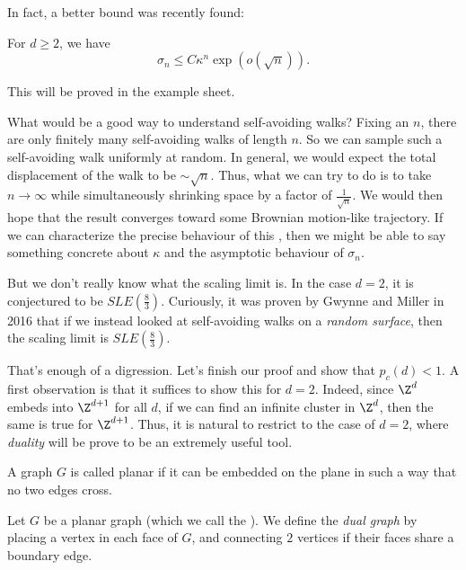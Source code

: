 \documentclass[a4paper]{article}
\begin{document}
In fact, a better bound was recently found:
\begin{thm}[Hutchcroft, 2017]
  For $d \geq 2$, we have
  \[
     \sigma_n \leq C \kappa^n \exp(o(\sqrt{n})).
  \]
\end{thm}
This will be proved in the example sheet.

What would be a good way to understand self-avoiding walks? Fixing an $n$, there are only finitely many self-avoiding walks of length $n$. So we can sample such a self-avoiding walk uniformly at random. In general, we would expect the total displacement of the walk to be $\sim \sqrt{n}$. Thus, what we can try to do is to take $n \to \infty$ while simultaneously shrinking space by a factor of $\frac{1}{\sqrt{n}}$. We would then hope that the result converges toward some Brownian motion-like trajectory. If we can characterize the precise behaviour of this , then we might be able to say something concrete about $\kappa$ and the asymptotic behaviour of $\sigma_n$.

But we don't really know what the scaling limit is. In the case $d = 2$, it is conjectured to be $SLE(\frac{8}{3})$. Curiously, it was proven by Gwynne and Miller in 2016 that if we instead looked at self-avoiding walks on a \emph{random surface}, then the scaling limit is $SLE(\frac{8}{3})$.

That's enough of a digression. Let's finish our proof and show that $p_c(d) < 1$. A first observation is that it suffices to show this for $d = 2$. Indeed, since $\Z^d$ embeds into $\Z^{d + 1}$ for all $d$, if we can find an infinite cluster in $\Z^d$, then the same is true for $\Z^{d + 1}$. Thus, it is natural to restrict to the case of $d = 2$, where \emph{duality} will be prove to be an extremely useful tool.

\begin{defi}
  A graph $G$ is called planar if it can be embedded on the plane in such a way that no two edges cross.
\end{defi}

\begin{defi}
  Let $G$ be a planar graph (which we call the ). We define the \emph{dual graph} by placing a vertex in each face of $G$, and connecting $2$ vertices if their faces share a boundary edge.
\end{defi}
\end{document}
